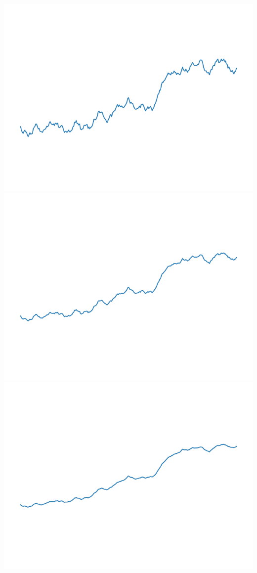 \documentclass[11pt,class=report,crop=false]{standalone}
\begin{document}
\begin{exemple}
\begin{center}
\includegraphics[scale=\myscale,scale=0.2]{figures/landscape-06-07}
\includegraphics[scale=\myscale,scale=0.2]{figures/landscape-06-09}
\includegraphics[scale=\myscale,scale=0.2]{figures/landscape-06-11}

\end{center}
\end{exemple}
\end{document}

